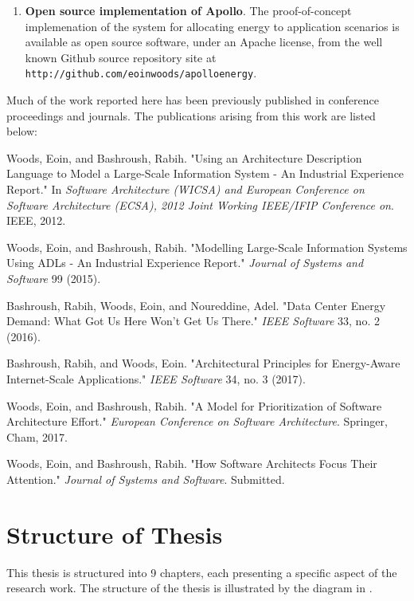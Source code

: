 \begin{enumerate}
	\item \textbf{Open source implementation of Apollo}.  The proof-of-concept implemenation of the system for allocating energy to application scenarios is available as open source software, under an Apache license, from the well known Github source repository site at \texttt{http://github.com/eoinwoods/apolloenergy}.
\end{enumerate}

Much of the work reported here has been previously published in conference proceedings and journals. The publications arising from this work are listed below: \nopagebreak
\begin{description}
	\item Woods, Eoin, and Bashroush, Rabih. "Using an Architecture Description Language to Model a Large-Scale Information System - An Industrial Experience Report." In \emph{Software Architecture (WICSA) and European Conference on Software Architecture (ECSA), 2012 Joint Working IEEE/IFIP Conference on}. IEEE, 2012.
	\item Woods, Eoin, and Bashroush, Rabih. "Modelling Large-Scale Information Systems Using ADLs - An Industrial Experience Report." \emph{Journal of Systems and Software} 99 (2015).
	\item Bashroush, Rabih, Woods, Eoin, and Noureddine, Adel. "Data Center Energy Demand: What Got Us Here Won't Get Us There." \emph{IEEE Software} 33, no. 2 (2016).
	\item Bashroush, Rabih, and Woods, Eoin. "Architectural Principles for Energy-Aware Internet-Scale Applications." \emph{IEEE Software} 34, no. 3 (2017).
	\item Woods, Eoin, and Bashroush, Rabih. "A Model for Prioritization of Software Architecture Effort." \emph{European Conference on Software Architecture}. Springer, Cham, 2017.
	\item Woods, Eoin, and Bashroush, Rabih. "How Software Architects Focus Their Attention." \emph{Journal of Systems and Software}.  Submitted.
\end{description}


\section{Structure of Thesis}

This thesis is structured into 9 chapters, each presenting a specific aspect of the research work.  The structure of the thesis is illustrated by the diagram in .

